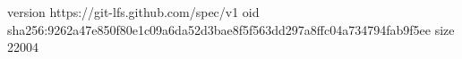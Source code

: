 version https://git-lfs.github.com/spec/v1
oid sha256:9262a47e850f80e1c09a6da52d3bae8f5f563dd297a8ffc04a734794fab9f5ee
size 22004
